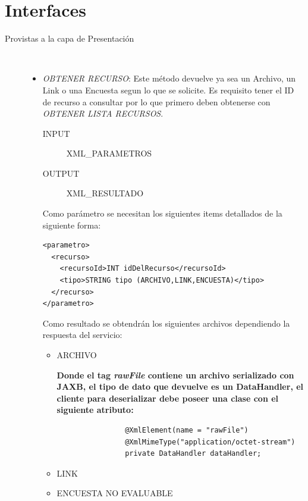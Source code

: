 \documentclass{article}
\begin{document}
\section{Interfaces}
	\begin{description}
		\item[Provistas a la capa de Presentaci\'on ] \
		\renewcommand{\labelitemi}{\ding{105}} 
		\begin{itemize}
		\item \emph{OBTENER RECURSO}:
			Este m\'etodo devuelve ya sea un Archivo, un Link o una Encuesta segun lo que se solicite. Es requisito tener el ID de recurso a consultar por lo que primero deben obtenerse con \emph{OBTENER LISTA RECURSOS}.
			\begin{description}
				\item[INPUT] XML\_PARAMETROS
				\item[OUTPUT] XML\_RESULTADO\\
			\end{description}
		

			Como par\'ametro se necesitan los siguientes items detallados de la siguiente forma:
				
\begin{lstlisting}
<parametro>
  <recurso>
    <recursoId>INT idDelRecurso</recursoId>
    <tipo>STRING tipo (ARCHIVO,LINK,ENCUESTA)</tipo>
  </recurso>
</parametro>
\end{lstlisting}
				
			Como resultado se obtendr\'an los siguientes archivos dependiendo la respuesta del servicio:
			

		\begin{itemize}
			\item ARCHIVO 
			
				
			\textbf{Donde el tag \emph{rawFile} contiene un archivo serializado con JAXB, el tipo de dato que devuelve es un DataHandler, el cliente para deserializar debe poseer una clase con el siguiente atributo:} \newline
			\begin{verbatim}
				@XmlElement(name = "rawFile")
				@XmlMimeType("application/octet-stream")
				private DataHandler dataHandler;
			\end{verbatim}
			
			\item LINK
			
			
\clearpage
			
			\item ENCUESTA NO EVALUABLE
			

\end{itemize}
\end{itemize}
\end{description}
\end{document}
